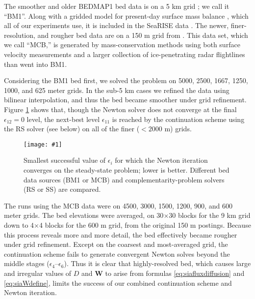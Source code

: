 \documentclass[twocolumn,a4paper]{igs}
\newcommand{\onecol}[1]{\texttt{[image: \#1]}}
\newcommand\bW{\mathbf{W}}
\newcommand\eps{\epsilon}
\begin{document}
\newcommand{\BM}{\textsf{BM1}\xspace}
\newcommand{\MCB}{\textsf{MCB}\xspace}
\newcommand{\virs}{\textsf{RS}\xspace}
\newcommand{\viss}{\textsf{SS}\xspace}

The smoother and older BEDMAP1 bed data is on a 5 km grid \citep{Bamberetal2001}; we call it ``\BM''.  Along with a gridded model for present-day surface mass balance \citep{Ettemaetal2009}, which all of our experiments use, it is included in the SeaRISE data \citep{Bindschadleretal2013}.  The newer, finer-resolution, and rougher bed data are on a 150 m grid from \cite{Morlighemetal2014}.  This data set, which we call ``\MCB,'' is generated by mass-conservation methods using both surface velocity measurements and a larger collection of ice-penetrating radar flightlines than went into \BM.

Considering the \BM bed first, we solved the problem on 5000, 2500, 1667, 1250, 1000, and 625 meter grids.  In the sub-5 km cases we refined the data using bilinear interpolation, and thus the bed became smoother under grid refinement.  Figure \ref{fig:grnrobusteps} shows that, though the Newton solver does not converge at the final $\eps_{12}=0$ level, the next-best level $\eps_{11}$ is reached by the continuation scheme using the \virs solver (see below) on all of the finer ($<2000$ m) grids.

\begin{figure}[ht]
\onecol{grnrobusteps.pdf}
\caption{Smallest successful value of $\eps_i$ for which the Newton iteration converges on the steady-state problem; lower is better.  Different bed data sources (\BM or \MCB) and complementarity-problem solvers (\virs or \viss) are compared.}
\label{fig:grnrobusteps}
\end{figure}

The runs using the \MCB data were on 4500, 3000, 1500, 1200, 900, and 600 meter grids.  The bed elevations were averaged, on 30$\times$30 blocks for the 9 km grid down to 4$\times$4 blocks for the 600 m grid, from the original 150 m postings.  Because this process reveals more and more detail, the bed effectively became rougher under grid refinement.  Except on the coarsest and most-averaged grid, the continuation scheme fails to generate convergent Newton solves beyond the middle stages ($\eps_4$--$\eps_6$).  Thus it is clear that highly-resolved bed, which causes large and irregular values of $D$ and $\bW$ to arise from formulas \eqref{eq:siafluxdiffusion} and \eqref{eq:siaWdefine}, limits the success of our combined continuation scheme and Newton iteration.
\end{document}

